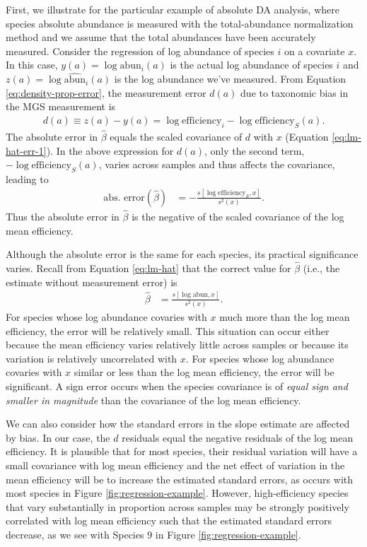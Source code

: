 \documentclass[
]{article}
\begin{document}
First, we illustrate for the particular example of absolute DA analysis, where species absolute abundance is measured with the total-abundance normalization method and we assume that the total abundances have been accurately measured.
Consider the regression of log abundance of species \(i\) on a covariate \(x\).
In this case, \(y(a)= \log \text{abun}_{i}(a)\) is the actual log abundance of species \(i\) and \(z(a)=\log \widehat{\text{abun}}_i(a)\) is the log abundance we've measured.
From Equation \eqref{eq:density-prop-error}, the measurement error \(d(a)\) due to taxonomic bias in the MGS measurement is
\begin{align}
  d(a) 
  \equiv z(a) - y(a) 
  = \log \text{efficiency}_i - \log \text{efficiency}_S(a).
\end{align}
The absolute error in \(\hat \beta\) equals the scaled covariance of \(d\) with \(x\) (Equation \eqref{eq:lm-hat-err-1}).
In the above expression for \(d(a)\), only the second term, \(- \log \text{efficiency}_S(a)\), varies across samples and thus affects the covariance, leading to
\begin{align}
  \text{abs. error}(\hat \beta)
    &= - \frac{s[\log \text{efficiency}_S, x]}{s^2(x)}.
\end{align}
Thus the absolute error in \(\hat \beta\) is the negative of the scaled covariance of the log mean efficiency.

Although the absolute error is the same for each species, its practical significance varies.
Recall from Equation \eqref{eq:lm-hat} that the correct value for \(\hat \beta\) (i.e., the estimate without measurement error) is
\begin{align}
  \hat \beta &= \frac{s[\log \text{abun}, x]}{s^2(x)}.
\end{align}
For species whose log abundance covaries with \(x\) much more than the log mean efficiency, the error will be relatively small.
This situation can occur either because the mean efficiency varies relatively little across samples or because its variation is relatively uncorrelated with \(x\).
For species whose log abundance covaries with \(x\) similar or less than the log mean efficiency, the error will be significant.
A sign error occurs when the species covariance is of \emph{equal sign and smaller in magnitude} than the covariance of the log mean efficiency.

We can also consider how the standard errors in the slope estimate are affected by bias.
In our case, the \(d\) residuals equal the negative residuals of the log mean efficiency.
It is plausible that for most species, their residual variation will have a small covariance with log mean efficiency and the net effect of variation in the mean efficiency will be to increase the estimated standard errors, as occurs with most species in Figure \ref{fig:regression-example}.
However, high-efficiency species that vary substantially in proportion across samples may be strongly positively correlated with log mean efficiency such that the estimated standard errors decrease, as we see with Species 9 in Figure \ref{fig:regression-example}.
\end{document}
